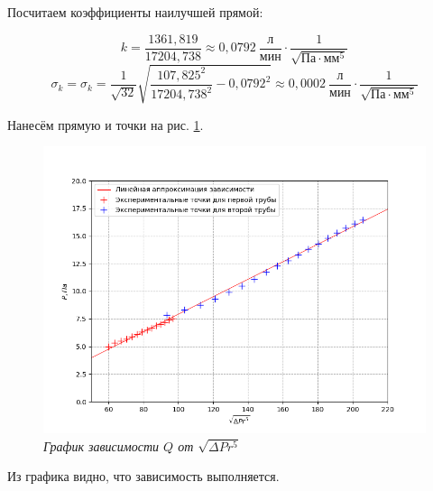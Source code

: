 \documentclass[a4paper,12pt]{article}
\begin{document}
Посчитаем коэффициенты наилучшей прямой:

\begin{equation*}
    k = \frac{1361,819}{17204,738} \approx 0,0792 \ \frac{\text{л}}{\text{мин}} \cdot \frac{1}{\sqrt{\text{Па} \cdot \text{мм}^5}}
\end{equation*}
\begin{equation*}
    \sigma_k = \sigma_k = \frac{1}{\sqrt{32}} \sqrt{\frac{{107,825}^2}{{17204,738}^2} - {0,0792}^2} \approx 0,0002 \ \frac{\text{л}}{\text{мин}} \cdot \frac{1}{\sqrt{\text{Па} \cdot \text{мм}^5}}
\end{equation*}

Нанесём прямую и точки на рис. \ref{graph:q-pr}.

\begin{figure}[h!]
        \centering
	\includegraphics[width=1\textwidth]{graph_q-pr.png}
	\caption{\textit{График зависимости $Q$ от $\sqrt{\Delta P r^5}$}}
	\label{graph:q-pr}
\end{figure}

Из графика видно, что зависимость выполняется.

\clearpage
\end{document}
